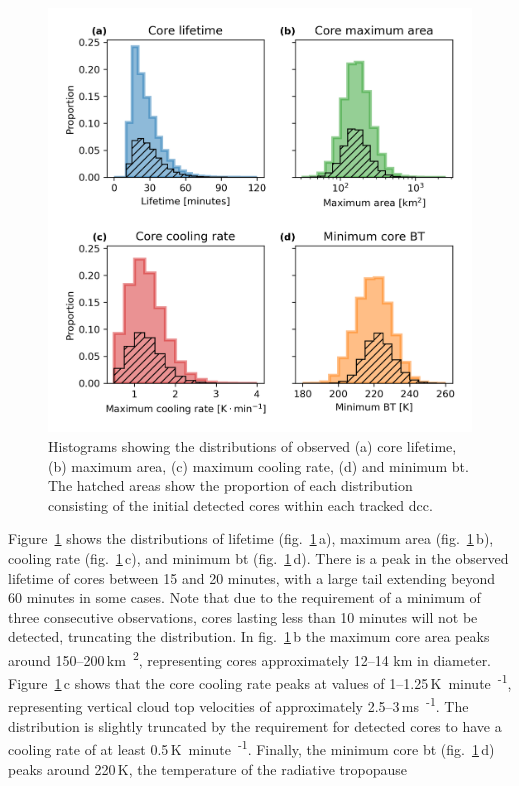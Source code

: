 \begin{figure}[tp]
    \centering
    \includegraphics[width=\textwidth]{figures/chapter2_08.png}
    \caption[
    Histograms showing the distributions of observed core lifetimes, maximum areas, cooling rates and \acrshort{bt}
    ]{
    Histograms showing the distributions of observed (a) core lifetime, (b) maximum area, (c) maximum cooling rate, (d) and minimum \acrshort{bt}. The hatched areas show the proportion of each distribution consisting of the initial detected cores within each tracked \acrshort{dcc}.
    }
    \label{fig:core_properties}
\end{figure}

Figure~\ref{fig:core_properties} shows the distributions of lifetime (fig.~\ref{fig:core_properties}\,a), maximum area (fig.~\ref{fig:core_properties}\,b), cooling rate (fig.~\ref{fig:core_properties}\,c), and minimum \acrshort{bt} (fig.~\ref{fig:core_properties}\,d).
There is a peak in the observed lifetime of cores between 15 and 20 minutes, with a large tail extending beyond 60 minutes in some cases.
Note that due to the requirement of a minimum of three consecutive observations, cores lasting less than 10 minutes will not be detected, truncating the distribution.
In fig.~\ref{fig:core_properties}\,b the maximum core area peaks around 150--200\,\unit{km\textsuperscript{2}}, representing cores approximately 12--14 km in diameter.
Figure~\ref{fig:core_properties}\,c shows that the core cooling rate peaks at values of 1--1.25\,\unit{K minute\textsuperscript{-1}}, representing vertical cloud top velocities of approximately 2.5--3\,\unit{ms\textsuperscript{-1}}.
The distribution is slightly truncated by the requirement for detected cores to have a cooling rate of at least 0.5\,\unit{K minute\textsuperscript{-1}}.
Finally, the minimum core \acrshort{bt} (fig.~\ref{fig:core_properties}\,d) peaks around 220\,\unit{K}, the temperature of the radiative tropopause \citep{jeevanjee_simple_2020}

